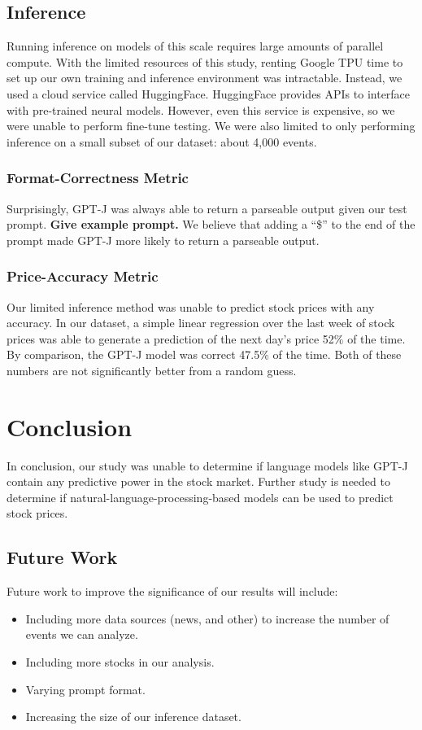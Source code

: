 \documentclass[conference]{IEEEtran}
\begin{document}
\subsection{Inference}
Running inference on models of this scale requires large amounts of parallel compute. With the limited resources of this study, renting Google TPU time to set up our own training and inference environment was intractable. Instead, we used a cloud service called HuggingFace. HuggingFace provides APIs to interface with pre-trained neural models. However, even this service is expensive, so we were unable to perform fine-tune testing. We were also limited to only performing inference on a small subset of our dataset: about 4,000 events.
\subsubsection{Format-Correctness Metric}
Surprisingly, GPT-J was always able to return a parseable output given our test prompt. \textbf{Give example prompt.} We believe that adding a ``\$'' to the end of the prompt made GPT-J more likely to return a parseable output.
\subsubsection{Price-Accuracy Metric}
Our limited inference method was unable to predict stock prices with any accuracy. In our dataset, a simple linear regression over the last week of stock prices was able to generate a prediction of the next day's price 52\% of the time. By comparison, the GPT-J model was correct 47.5\% of the time. Both of these numbers are not significantly better from a random guess. 
\section{Conclusion}
In conclusion, our study was unable to determine if language models like GPT-J contain any predictive power in the stock market. Further study is needed to determine if natural-language-processing-based models can be used to predict stock prices.
\subsection{Future Work}
Future work to improve the significance of our results will include:
\begin{itemize}
    \item Including more data sources (news, and other) to increase the number of events we can analyze.
    \item Including more stocks in our analysis.
    \item Varying prompt format.
    \item Increasing the size of our inference dataset.
\end{itemize}





\end{document}
